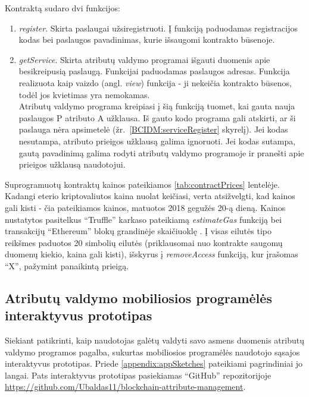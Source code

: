 Kontraktą sudaro dvi funkcijos:

\begin{enumerate}
    \item \textit{register}. Skirta paslaugai užsiregistruoti. Į funkciją paduodamas registracijos kodas bei paslaugos pavadinimas, kurie išsaugomi kontrakto būsenoje.
    \item \textit{getService}. Skirta atributų valdymo programai išgauti duomenis apie besikreipusią paslaugą. Funkcijai paduodamas paslaugos adresas.
    Funkcija realizuota kaip vaizdo (angl. \textit{view}) funkcija - ji nekeičia kontrakto būsenos, todėl jos kvietimas yra nemokamas. \\ 
    Atributų valdymo programa kreipiasi į šią funkciją tuomet, kai gauta nauja paslaugos P atributo A užklausa.
    Iš gauto kodo programa gali atskirti, ar ši paslauga nėra apsimetelė
    (žr.\hypertarget{BCIDM:serviceRegister}{~\ref{BCIDM:serviceRegister} skyrelį}). Jei kodas nesutampa, atributo prieigos užklausą galima ignoruoti. Jei kodas sutampa,
    gautą pavadinimą galima rodyti atributų valdymo programoje ir pranešti apie prieigos užklausą naudotojui.
\end{enumerate}

Suprogramuotų kontraktų kainos pateikiamos \hypertarget{tab:contractPrices}{\ref{tab:contractPrices}} lentelėje. Kadangi eterio kriptovaliutos kaina
nuolat keičiasi, verta atsižvelgti, kad kainos gali kisti - čia pateikiamos kainos, matuotos 2018 gegužės 20-ą dieną. Kainos nustatytos
pasitelkus \enquote{Truffle} karkaso pateikiamą \textit{estimateGas} funkciją bei transakcijų \enquote{Ethereum} blokų grandinėje skaičiuoklę \cite{EthereumGasStation}.
Į visas eilutės tipo reikšmes paduotos 20 simbolių eilutės (priklausomai nuo kontrakte saugomų duomenų kiekio, kaina gali kisti), išskyrus
į \textit{removeAccess} funkciją, kur įrašomas \enquote{X}, pažymint panaikintą prieigą.



\subsection{Atributų valdymo mobiliosios programėlės interaktyvus prototipas}

Siekiant patikrinti, kaip naudotojas galėtų valdyti savo asmens duomenis atributų valdymo programos pagalba, sukurtas mobiliosios programėlės naudotojo sąsajos interaktyvus prototipas. Priede \hypertarget{appendix:appSketches}{\ref{appendix:appSketches}} pateikiami pagrindiniai jo
langai. Pats interaktyvus prototipas pasiekiamas \enquote{GitHub} repozitorijoje
\url{https://github.com/Ubaldas11/blockchain-attribute-management}.

